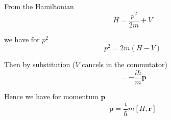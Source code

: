 From the Hamiltonian
\begin{equation*}
H=\frac{p^2}{2m}+V
\end{equation*}

we have for $p^2$
\begin{equation*}
p^2=2m(H-V)
\end{equation*}

Then by substitution ($V$ cancels in the commutator)
\begin{equation*}
[H,\mathbf r]=-\frac{i\hbar}{m}\mathbf p
\end{equation*}

Hence we have for momentum $\mathbf p$
\begin{equation*}
\mathbf p=\frac{i}{\hbar}m[H,\mathbf r]
\end{equation*}


